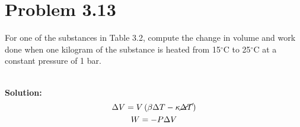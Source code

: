 \documentclass{article}
\newenvironment{solution}{\par\noindent\textbf{\\Solution:\\}}{\par\medskip}
\begin{document}
\pagebreak

\section*{Problem 3.13}
For one of the substances in Table 3.2, compute the change in volume and work done when one kilogram of the substance is heated from 15$^\circ$C to 25$^\circ$C at a constant pressure of 1 bar.

\begin{solution}
      \begin{gather*}
            \Delta V=V\left( \beta \Delta T-\kappa \cancel{\Delta T}   \right)\\
            W=-P\Delta V
      \end{gather*}
\begin{center}
\end{center}
\end{solution}
\end{document}
